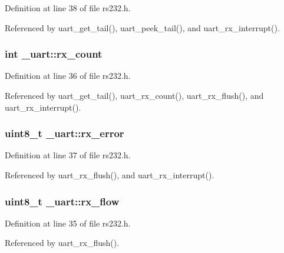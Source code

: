 Definition at line 38 of file rs232.\-h.



Referenced by uart\-\_\-get\-\_\-tail(), uart\-\_\-peek\-\_\-tail(), and uart\-\_\-rx\-\_\-interrupt().

\hypertarget{struct__uart_a50b344402c339343e3f32c82358e190c}{
\subsubsection[{rx\-\_\-count}]{\setlength{\rightskip}{0pt plus 5cm}int \-\_\-uart\-::rx\-\_\-count}}\label{struct__uart_a50b344402c339343e3f32c82358e190c}


Definition at line 36 of file rs232.\-h.



Referenced by uart\-\_\-get\-\_\-tail(), uart\-\_\-rx\-\_\-count(), uart\-\_\-rx\-\_\-flush(), and uart\-\_\-rx\-\_\-interrupt().

\hypertarget{struct__uart_a6c0b44754c36dd831e1da4f02b124167}{
\subsubsection[{rx\-\_\-error}]{\setlength{\rightskip}{0pt plus 5cm}uint8\-\_\-t \-\_\-uart\-::rx\-\_\-error}}\label{struct__uart_a6c0b44754c36dd831e1da4f02b124167}


Definition at line 37 of file rs232.\-h.



Referenced by uart\-\_\-rx\-\_\-flush(), and uart\-\_\-rx\-\_\-interrupt().

\hypertarget{struct__uart_a193691b69079880daf5b5b9894fb6aa5}{
\subsubsection[{rx\-\_\-flow}]{\setlength{\rightskip}{0pt plus 5cm}uint8\-\_\-t \-\_\-uart\-::rx\-\_\-flow}}\label{struct__uart_a193691b69079880daf5b5b9894fb6aa5}


Definition at line 35 of file rs232.\-h.



Referenced by uart\-\_\-rx\-\_\-flush().


